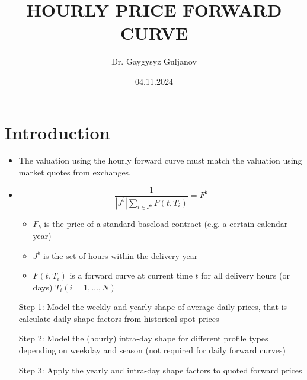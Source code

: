 \documentclass{beamer}
\title{\fontsize{12pt}{15pt} \selectfont HOURLY PRICE FORWARD CURVE}
\author{Dr. Gaygysyz Guljanov}
\institute{University of Münster}
\date{04.11.2024}
\begin{document}
\frame{\titlepage}


\section{Introduction}
\begin{frame}
    \begin{itemize}
        \item The valuation using the hourly forward curve must match the valuation using market quotes from exchanges.
        \item
              \[
                  \frac{1}{|J^b| \sum_{i \in J^b} F(t, T_i)} = F^b
              \]
              \begin{itemize}
                  \item $F_b$ is the price of a standard baseload contract (e.g. a certain calendar year)
                  \item $J^b$ is the set of hours within the delivery year
                  \item $F(t, T_i)$ is a forward curve at current time $t$ for all delivery hours (or days) $T_i (i = 1, \ldots, N)$
              \end{itemize}
    \end{itemize}
\end{frame}


\begin{frame}
    \begin{itemize}
        \item[Step 1:] Model the weekly and yearly shape of average daily prices, that is calculate daily shape factors from historical spot prices

        \item[Step 2:] Model the (hourly) intra-day shape for different profile types depending on weekday and season (not required for daily forward curves)

        \item[Step 3:] Apply the yearly and intra-day shape factors to quoted forward prices
    \end{itemize}
\end{frame}
\end{document}
